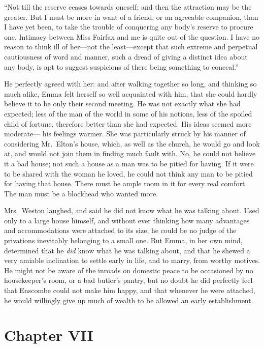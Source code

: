 ``Not till the reserve ceases towards oneself; and then the attraction
may be the greater.  But I must be more in want of a friend,
or an agreeable companion, than I have yet been, to take
the trouble of conquering any body's reserve to procure one.
Intimacy between Miss Fairfax and me is quite out of the question.
I have no reason to think ill of her---not the least---except that
such extreme and perpetual cautiousness of word and manner,
such a dread of giving a distinct idea about any body, is apt
to suggest suspicions of there being something to conceal.''

He perfectly agreed with her:  and after walking together so long,
and thinking so much alike, Emma felt herself so well acquainted with him,
that she could hardly believe it to be only their second meeting.
He was not exactly what she had expected; less of the man of the
world in some of his notions, less of the spoiled child of fortune,
therefore better than she had expected.  His ideas seemed more moderate---%
his feelings warmer.  She was particularly struck by his manner
of considering Mr.\ Elton's house, which, as well as the church,
he would go and look at, and would not join them in finding much
fault with.  No, he could not believe it a bad house; not such a house
as a man was to be pitied for having.  If it were to be shared with
the woman he loved, he could not think any man to be pitied for having
that house.  There must be ample room in it for every real comfort.
The man must be a blockhead who wanted more.

Mrs.\ Weston laughed, and said he did not know what he was talking about.
Used only to a large house himself, and without ever thinking how many
advantages and accommodations were attached to its size, he could
be no judge of the privations inevitably belonging to a small one.
But Emma, in her own mind, determined that he \emph{did} know what he
was talking about, and that he shewed a very amiable inclination
to settle early in life, and to marry, from worthy motives.
He might not be aware of the inroads on domestic peace to be
occasioned by no housekeeper's room, or a bad butler's pantry,
but no doubt he did perfectly feel that Enscombe could not make
him happy, and that whenever he were attached, he would willingly
give up much of wealth to be allowed an early establishment.



\chapter{Chapter VII}


